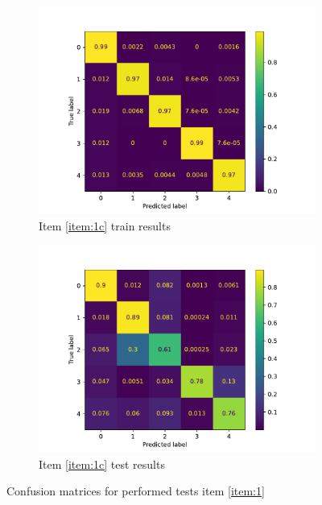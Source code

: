 \documentclass[10pt, a4paper]{article}
\begin{document}
\begin{figure}[htpb]
\begin{subfigure}[b]{0.47\textwidth}
    \includegraphics[width=\textwidth]{images/Patch128_imagenet_cm_train.pdf}
    \caption{Item \ref{item:1c} train results}
    \label{fig:q1c_cm_train}
  \end{subfigure}
  \hfill
  \begin{subfigure}[b]{0.47\textwidth}
    \centering
    \includegraphics[width=\textwidth]{images/Patch128_imagenet_cm_test.pdf}
    \caption{Item \ref{item:1c} test results}
    \label{fig:q1c_cm_test}
  \end{subfigure}
  \hfill
  \caption{Confusion matrices for performed tests item \ref{item:1}}
  \label{fig:q1_cm_results}
\end{figure}
\end{document}
